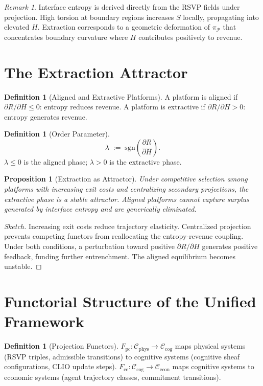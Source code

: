 \documentclass[11pt]{article}
\theoremstyle{plain}
\newtheorem{proposition}[theorem]{Proposition}
\theoremstyle{definition}
\newtheorem{definition}[theorem]{Definition}
\theoremstyle{remark}
\newtheorem{remark}[theorem]{Remark}
\newcommand{\Ss}{S}
\newcommand{\Fpc}{F_{\mathrm{pc}}}
\newcommand{\Fce}{F_{\mathrm{ce}}}
\begin{document}
\begin{remark}
Interface entropy is derived directly from the RSVP fields under projection.
High torsion at boundary regions increases $\Ss$ locally, propagating into
elevated $H$. Extraction corresponds to a geometric deformation of
$\pi_{\mathcal{P}}$ that concentrates boundary curvature where $H$
contributes positively to revenue.
\end{remark}

\section{The Extraction Attractor}

\begin{definition}[Aligned and Extractive Platforms]
A platform is aligned if $\partial R / \partial H \leq 0$: entropy reduces
revenue. A platform is extractive if $\partial R / \partial H > 0$: entropy
generates revenue.
\end{definition}

\begin{definition}[Order Parameter]
\[
  \lambda \;:=\; \mathrm{sgn}\!\left(\frac{\partial R}{\partial H}\right).
\]
$\lambda \leq 0$ is the aligned phase; $\lambda > 0$ is the extractive phase.
\end{definition}

\begin{proposition}[Extraction as Attractor]
Under competitive selection among platforms with increasing exit costs and
centralizing secondary projections, the extractive phase is a stable
attractor. Aligned platforms cannot capture surplus generated by interface
entropy and are generically eliminated.
\end{proposition}

\begin{proof}[Sketch]
Increasing exit costs reduce trajectory elasticity. Centralized projection
prevents competing functors from reallocating the entropy-revenue coupling.
Under both conditions, a perturbation toward positive $\partial R/\partial H$
generates positive feedback, funding further entrenchment. The aligned
equilibrium becomes unstable.
\end{proof}

\section{Functorial Structure of the Unified Framework}

\begin{definition}[Projection Functors]
$\Fpc : \mathcal{C}_{\mathrm{phys}} \to \mathcal{C}_{\mathrm{cog}}$ maps
physical systems (RSVP triples, admissible transitions) to cognitive systems
(cognitive sheaf configurations, CLIO update steps).
$\Fce : \mathcal{C}_{\mathrm{cog}} \to \mathcal{C}_{\mathrm{econ}}$ maps
cognitive systems to economic systems (agent trajectory classes, commitment
transitions).
\end{definition}
\end{document}
